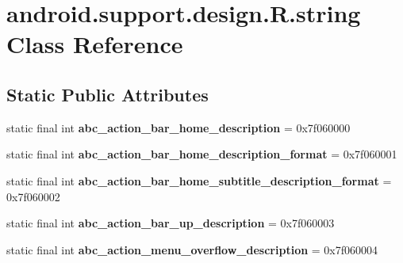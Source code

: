 \hypertarget{classandroid_1_1support_1_1design_1_1_r_1_1string}{}\section{android.\+support.\+design.\+R.\+string Class Reference}
\label{classandroid_1_1support_1_1design_1_1_r_1_1string}
\subsection*{Static Public Attributes}
\begin{DoxyCompactItemize}
\item 
\hypertarget{classandroid_1_1support_1_1design_1_1_r_1_1string_ae94186933fbea8b608ced5c610548d2e}{}static final int {\bfseries abc\+\_\+action\+\_\+bar\+\_\+home\+\_\+description} = 0x7f060000\label{classandroid_1_1support_1_1design_1_1_r_1_1string_ae94186933fbea8b608ced5c610548d2e}

\item 
\hypertarget{classandroid_1_1support_1_1design_1_1_r_1_1string_aec1855ecfa354e84067b7fca0aa1a8de}{}static final int {\bfseries abc\+\_\+action\+\_\+bar\+\_\+home\+\_\+description\+\_\+format} = 0x7f060001\label{classandroid_1_1support_1_1design_1_1_r_1_1string_aec1855ecfa354e84067b7fca0aa1a8de}

\item 
\hypertarget{classandroid_1_1support_1_1design_1_1_r_1_1string_abf2c1e6008ec0466820d6998146bd96c}{}static final int {\bfseries abc\+\_\+action\+\_\+bar\+\_\+home\+\_\+subtitle\+\_\+description\+\_\+format} = 0x7f060002\label{classandroid_1_1support_1_1design_1_1_r_1_1string_abf2c1e6008ec0466820d6998146bd96c}

\item 
\hypertarget{classandroid_1_1support_1_1design_1_1_r_1_1string_a6879bf96dd0f053bc7b186fe5cc8fc3a}{}static final int {\bfseries abc\+\_\+action\+\_\+bar\+\_\+up\+\_\+description} = 0x7f060003\label{classandroid_1_1support_1_1design_1_1_r_1_1string_a6879bf96dd0f053bc7b186fe5cc8fc3a}

\item 
\hypertarget{classandroid_1_1support_1_1design_1_1_r_1_1string_a0da53f31459d40d1c77cb1a7e89746cb}{}static final int {\bfseries abc\+\_\+action\+\_\+menu\+\_\+overflow\+\_\+description} = 0x7f060004\label{classandroid_1_1support_1_1design_1_1_r_1_1string_a0da53f31459d40d1c77cb1a7e89746cb}


\end{DoxyCompactItemize}
